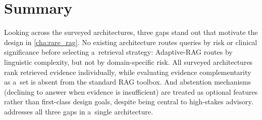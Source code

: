 \section{Summary}
\label{sec:background_summary}

Looking across the surveyed architectures, three gaps stand out that motivate the
\rarerag{} design in \cref{cha:rare_rag}.
No existing architecture routes queries by risk or clinical significance before
selecting a~retrieval strategy: Adaptive-RAG routes by linguistic complexity,
but not by domain-specific risk.
All surveyed architectures rank retrieved evidence individually, while evaluating
evidence complementarity as a~set is absent from the standard RAG toolbox.
And abstention mechanisms (declining to answer when evidence is insufficient)
are treated as optional features rather than first-class design goals, despite
being central to high-stakes advisory.
\rarerag{} addresses all three gaps in a~single architecture.
